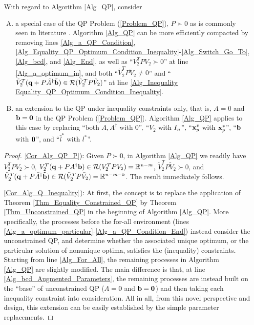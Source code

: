 \documentclass{imaman}
\newcommand{\bfb}{{\bf b}}
\newcommand{\bfx}{{\bf x}}
\newcommand{\bfq}{{\bf q}}
\newcommand{\bfzero}{{\bf 0}}
\newcommand{\real}{\mathbb{R}}
\newcommand{\calR}{{\mathcal R}}
\newcommand{\itk}{{\it k}}
\newcommand{\itm}{{\it m}}
\newcommand{\itn}{{\it n}}
\numberwithin{equation}{section}
\begin{document}
\begin{corollary} With regard to Algorithm {\rm\ref{Alg_QP}}, consider
\begin{enumerate}[A)]
\item\label{Cor_Alg_QP_P} a special case of the QP Problem {\rm(\ref{Problem_QP})}, $P\succ 0$ as is commonly seen in literature {\rm\citep{Lu(Ye):03(16)}}. Algorithm {\rm\ref{Alg_QP}} can be more efficiently compacted by removing lines {\rm\ref{Alg_a_QP_Condition}}, {\rm\ref{Alg_Equality_QP_Optimum_Condition_Inequality}}-{\rm\ref{Alg_Switch_Go_To}}, {\rm\ref{Alg_bcd}}, and {\rm\ref{Alg_End}}, as well as ``$V_2^TPV_2\succ 0$'' at line {\rm\ref{Alg_a_optimum_in}}, and both ``$\tilde V_2^TP\tilde V_2\ne 0$'' and ``$\tilde V_2^T(\bfq+P\tilde A^\dagger\tilde\bfb)\in\calR(\tilde V_2^TP\tilde V_2)$'' at line {\rm\ref{Alg_Inequality Equality_QP_Optimum_Condition_Inequality}}.
\item\label{Cor_Alg_Q_Inequality} an extension to the QP under inequality constraints only, that is, $A=0$ and $\bfb=\bfzero$ in the QP Problem {\rm(\ref{Problem_QP})}. Algorithm {\rm\ref{Alg_QP}} applies to this case by replacing ``both $A, A^\dagger$ with $0$'', ``$V_2$ with $I_\itn$'', ``$\bfx_p^{\bar *}$ with $\bfx_p^*$'', ``$\bfb$ with $\bfzero$'', and ``$\bar l^*$ with $l^*$''.
\end{enumerate}
\label{Cor_Alg_QP}
\end{corollary}

\begin{proof}
\ref{Cor_Alg_QP_P}): Given $P\succ 0$, in Algorithm \ref{Alg_QP} we readily have $V_2^TPV_2\succ 0$, $V_2^T(\bfq+PA^\dagger\bfb)\in\calR(V_2^TPV_2)=\real^{\itn-\itm}$, $\tilde V_2^TP\tilde V_2\succ 0$, and $\tilde V_2^T(\bfq+P\tilde A^\dagger\tilde\bfb)\in\calR(\tilde V_2^TP\tilde V_2)=\real^{\itn-\itm-\itk}$. The result immediately follows.

\ref{Cor_Alg_Q_Inequality}): At first, the concept is to replace the application of Theorem \ref{Thm_Equality_Constrained_QP} by Theorem \ref{Thm_Unconstrained_QP} in the beginning of Algorithm \ref{Alg_QP}. More specifically, the processes before the for-all environment (lines \ref{Alg_a_optimum_particular}-\ref{Alg_a_QP_Condition_End}) instead consider the unconstrained QP, and determine whether the associated unique optimum, or the particular solution of nonunique optima, satisfies the (inequality) constraints. Starting from line \ref{Alg_For_All}, the remaining processes in Algorithm \ref{Alg_QP} are slightly modified. The main difference is that, at line \ref{Alg_bcd_Augmented_Parameters}, the remaining processes are instead built on the ``base'' of unconstrained QP ($A=0$ and $\bfb=\bfzero$) and then taking each inequality constraint into consideration. All in all, from this novel perspective and design, this extension can be easily established by the simple parameter replacements.
\end{proof}
\end{document}
